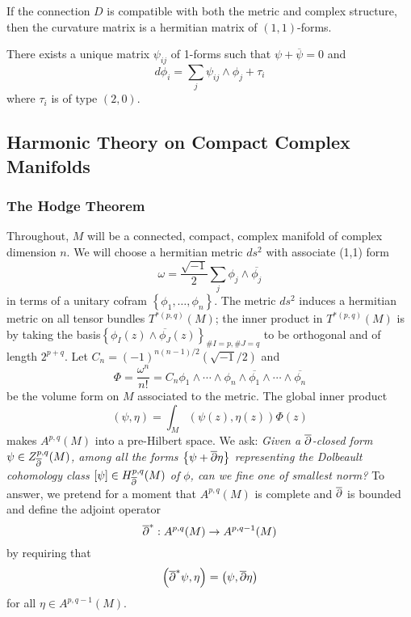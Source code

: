 \begin{prop}

	If the connection $D$ is compatible with both the metric and complex structure, then the curvature matrix is a hermitian matrix of $(1,1)$-forms.

\end{prop}

\begin{lem}

There exists a unique matrix $ \psi_{ ij }$ of 1-forms such that $ \psi + \overline{ \psi} = 0$ and 
\[
d \phi_i = \sum_j \psi_{ ij } \wedge \phi_j + \tau_i
\]
where $ \tau_i$ is of type $ (2,0)$.

\end{lem}
\subsection{Harmonic Theory on Compact Complex Manifolds}
\subsubsection{The Hodge Theorem}
Throughout, $M$ will be a connected, compact, complex manifold of complex dimension $n$. We will choose a hermitian metric $ds^2$ with associate (1,1) form 
\[
\omega = \frac{ \sqrt{-1}}{2} \sum_j \phi_j \wedge \overline{ \phi_j} 
\]
in terms of a unitary cofram $ \left\{ \phi_1, \ldots, \phi_n \right\}$. The metric $ds^2$ induces a hermitian metric on all tensor bundles $T^{ *(p,q) } \left( M \right)$; the inner product in $ T^{ *(p,q) } \left( M \right)$ is by taking the basis$ \left\{ \phi_I (z) \wedge \overline{ \phi_J}(z) \right\}_{ \#I = p, \#J = q }$ to be orthogonal and of length $2^{ p+q }$. Let $C_n = (-1)^{ n(n-1)/2 } \left(  \sqrt{-1}/2 \right)$ and 
\[
	\Phi = \frac{ \omega^n}{n!} = C_n \phi_1 \wedge \cdots \wedge \phi_n \wedge \overline{ \phi_1} \wedge \cdots \wedge \overline{ \phi_n}
\]
be the volume form on $M$ associated to the metric. The global inner product
\[
	\left( \psi, \eta \right) = \int_M \left( \psi (z), \eta (z) \right) \Phi (z)
\]
makes $ A^{ p,q }(M)$ into a pre-Hilbert space. We ask: \textit{Given a $\overline{\partial}$-closed form $ \psi \in Z^{ p,q }_{ \overline{\partial} }(M)$, among all the forms $ \left\{ \psi + \overline{\partial} \eta \right\}$ representing the Dolbeault cohomology class $ \left[ \psi \right] \in H^{ p,q }_{ \overline{\partial} }(M)$ of $ \phi$, can we fine one of smallest norm?} To answer, we pretend for a moment that $ A^{ p,q }(M)$ is complete and $\overline{\partial}$ is bounded and define the adjoint operator
\[
	\overline{\partial}^*: A^{ p,q }(M) \to A^{ p,q-1 }(M)
\]
by requiring that
\[
	\left( \overline{\partial}^* \psi, \eta \right) = \left( \psi, \overline{\partial} \eta \right)
\]
for all $ \eta \in A^{ p,q-1 }(M)$.

